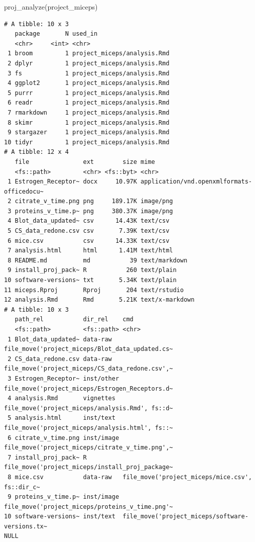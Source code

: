 \documentclass[12pt,twoside]{reedthesis}
\newenvironment{Shaded}{\begin{snugshade}}{\end{snugshade}}
\newcommand{\FunctionTok}[1]{\textcolor[rgb]{0.00,0.00,0.00}{#1}}
\newcommand{\NormalTok}[1]{#1}
\newcommand{\StringTok}[1]{\textcolor[rgb]{0.31,0.60,0.02}{#1}}
\begin{document}
\begin{Shaded}
\begin{Highlighting}[]
\FunctionTok{proj\_analyze}\NormalTok{(}\StringTok{\textquotesingle{}project\_miceps\textquotesingle{}}\NormalTok{)}
\end{Highlighting}
\end{Shaded}
\footnotesize
\begin{verbatim}
# A tibble: 10 x 3
   package       N used_in                    
   <chr>     <int> <chr>                      
 1 broom         1 project_miceps/analysis.Rmd
 2 dplyr         1 project_miceps/analysis.Rmd
 3 fs            1 project_miceps/analysis.Rmd
 4 ggplot2       1 project_miceps/analysis.Rmd
 5 purrr         1 project_miceps/analysis.Rmd
 6 readr         1 project_miceps/analysis.Rmd
 7 rmarkdown     1 project_miceps/analysis.Rmd
 8 skimr         1 project_miceps/analysis.Rmd
 9 stargazer     1 project_miceps/analysis.Rmd
10 tidyr         1 project_miceps/analysis.Rmd
# A tibble: 12 x 4
   file               ext        size mime                                      
   <fs::path>         <chr> <fs::byt> <chr>                                     
 1 Estrogen_Receptor~ docx     10.97K application/vnd.openxmlformats-officedocu~
 2 citrate_v_time.png png     189.17K image/png                                 
 3 proteins_v_time.p~ png     380.37K image/png                                 
 4 Blot_data_updated~ csv      14.43K text/csv                                  
 5 CS_data_redone.csv csv       7.39K text/csv                                  
 6 mice.csv           csv      14.33K text/csv                                  
 7 analysis.html      html      1.41M text/html                                 
 8 README.md          md           39 text/markdown                             
 9 install_proj_pack~ R           260 text/plain                                
10 software-versions~ txt       5.34K text/plain                                
11 miceps.Rproj       Rproj       204 text/rstudio                              
12 analysis.Rmd       Rmd       5.21K text/x-markdown                           
# A tibble: 10 x 3
   path_rel           dir_rel    cmd                                            
   <fs::path>         <fs::path> <chr>                                          
 1 Blot_data_updated~ data-raw   file_move('project_miceps/Blot_data_updated.cs~
 2 CS_data_redone.csv data-raw   file_move('project_miceps/CS_data_redone.csv',~
 3 Estrogen_Receptor~ inst/other file_move('project_miceps/Estrogen_Receptors.d~
 4 analysis.Rmd       vignettes  file_move('project_miceps/analysis.Rmd', fs::d~
 5 analysis.html      inst/text  file_move('project_miceps/analysis.html', fs::~
 6 citrate_v_time.png inst/image file_move('project_miceps/citrate_v_time.png',~
 7 install_proj_pack~ R          file_move('project_miceps/install_proj_package~
 8 mice.csv           data-raw   file_move('project_miceps/mice.csv', fs::dir_c~
 9 proteins_v_time.p~ inst/image file_move('project_miceps/proteins_v_time.png'~
10 software-versions~ inst/text  file_move('project_miceps/software-versions.tx~
NULL
\end{verbatim}
\normalsize
\end{document}
